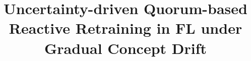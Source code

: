 \documentclass[conference]{IEEEtran}
\begin{document}
\title{Uncertainty-driven Quorum-based Reactive Retraining in FL under Gradual Concept Drift}


\author{
}



\maketitle
\end{document}
